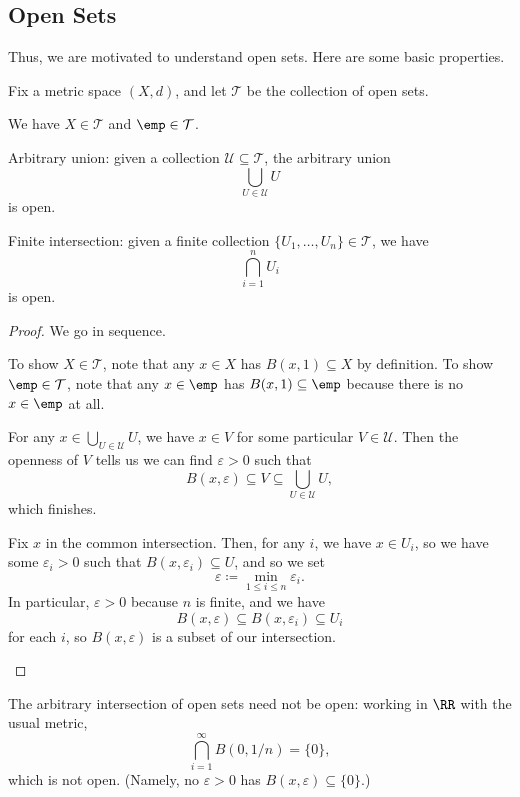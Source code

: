 \documentclass[../notes.tex]{subfiles}
\begin{document}
\subsection{Open Sets}
Thus, we are motivated to understand open sets. Here are some basic properties.
\begin{proposition} \label{prop:topodef}
	Fix a metric space $(X,d)$, and let $\mathcal T$ be the collection of open sets.
	\begin{listalph}
		\item We have $X\in\mathcal T$ and $\emp\in\mathcal T$.
		\item Arbitrary union: given a collection $\mathcal U\subseteq\mathcal T$, the arbitrary union
		\[\bigcup_{U\in\mathcal U}U\]
		is open.
		\item Finite intersection: given a finite collection $\{U_1,\ldots,U_n\}\in\mathcal T$, we have
		\[\bigcap_{i=1}^nU_i\]
		is open.
	\end{listalph}
\end{proposition}
\begin{proof}
	We go in sequence.
	\begin{listalph}
		\item To show $X\in\mathcal T$, note that any $x\in X$ has $B(x,1)\subseteq X$ by definition. To show $\emp\in\mathcal T$, note that any $x\in\emp$ has $B(x,1)\subseteq\emp$ because there is no $x\in\emp$ at all.
		\item For any $x\in\bigcup_{U\in\mathcal U}U$, we have $x\in V$ for some particular $V\in\mathcal U$. Then the openness of $V$ tells us we can find $\varepsilon>0$ such that
		\[B(x,\varepsilon)\subseteq V\subseteq\bigcup_{U\in\mathcal U}U,\]
		which finishes.
		\item Fix $x$ in the common intersection. Then, for any $i$, we have $x\in U_i$, so we have some $\varepsilon_i>0$ such that $B(x,\varepsilon_i)\subseteq U$, and so we set
		\[\varepsilon\coloneqq\min_{1\le i\le n}\varepsilon_i.\]
		In particular, $\varepsilon>0$ because $n$ is finite, and we have
		\[B(x,\varepsilon)\subseteq B(x,\varepsilon_i)\subseteq U_i\]
		for each $i$, so $B(x,\varepsilon)$ is a subset of our intersection.
		\qedhere
	\end{listalph}
\end{proof}
\begin{remark} \label{rem:singletonnotopen}
	The arbitrary intersection of open sets need not be open: working in $\RR$ with the usual metric,
	\[\bigcap_{i=1}^\infty B(0,1/n)=\{0\},\]
	which is not open. (Namely, no $\varepsilon>0$ has $B(x,\varepsilon)\subseteq\{0\}$.)
\end{remark}
\end{document}
